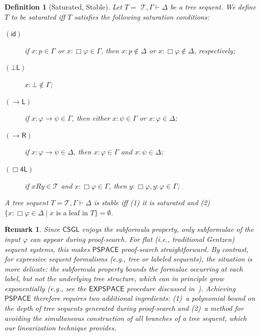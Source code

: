 \documentclass[copyright,creativecommons]{eptcs}
\newtheorem{definition}[theorem]{Definition}
\newtheorem{remark}[theorem]{Remark}
\newcommand{\tel}{\mathcal{T}}
\newcommand{\iffi}{\textit{iff} }
\renewcommand{\phi}{\varphi}
\newcommand{\calc}{\mathsf{CSGL}}
\newcommand{\lab}{\mathsf{Lab}}
\newcommand{\lang}{\mathscr{L}}
\newcommand{\id}{\mathsf{id}}
\newcommand{\sar}{\vdash}
\newcommand{\tseq}{T} %
\newcommand{\impleft}{{\rightarrow}\mathsf{L}}
\newcommand{\impright}{{\rightarrow}\mathsf{R}}
\newcommand{\treesequent}{ $\tel, \Gamma \sar \Delta$ }
\newcommand{\botrule}{\bot\mathsf{L}}
\newcommand{\set}[1]{\{#1\}}
\newcommand{\pspace}{\mathsf{PSPACE}}
\newcommand{\expspace}{\mathsf{EXPSPACE}}
\newcommand{\boxlc}{(\Box\mathsf{4L})}
\begin{document}
\begin{definition}[Saturated, Stable]\label{def:saturatedsequent}
Let $T =  $\treesequent be a tree sequent. We define $T$ to be \emph{saturated} \iffi $T$ satisfies the following \emph{saturation conditions}:
\begin{description}

\item[$(\id)$] if $x : p \in \Gamma$ or $x : \Box \phi \in \Gamma$, then $x : p \notin \Delta$ or $x : \Box \phi \notin \Delta$, respectively;

\item [$(\botrule)$] $x:\bot \notin \Gamma$;

\item [$(\impleft)$] if $x: \phi\rightarrow\psi \in \Gamma$, then either $x:\psi \in \Gamma$ or $x:\phi\in\Delta$;

\item [$(\impright)$] if $x: \phi\rightarrow\psi \in \Delta$, then $x:\phi \in \Gamma$ and $x:\psi\in\Delta$;

\item [$\boxlc$] if $xRy \in \tel$ and $x:\Box\phi\in\Gamma$, then $y: \Box\phi, y: \phi\in\Gamma$;

\end{description}
A tree sequent $\tseq = \tel, \Gamma \sar \Delta$ is \emph{stable} \iffi (1) it is saturated and (2) $\set{x : \Box \phi \in \Delta \mid x \text{ is a leaf in } \tseq} = \emptyset$. %
\end{definition}

\begin{remark}\label{rem:pspace-intuition} Since $\calc$ enjoys the subformula property, only subformulae of the input $\phi$ can appear during proof-search. For flat (i.e., traditional Gentzen) sequent systems, this makes $\pspace$ proof-search straightforward. By contrast, for expressive sequent formalisms (e.g., tree or labeled sequents), the situation is more delicate: the subformula property bounds 
the formulae occurring at each label, but not the underlying tree structure, which can in principle grow exponentially (e.g., see the $\expspace$ procedure discussed in~\cite{MagPer23}). Achieving $\pspace$ therefore requires two additional ingredients: (1)~a polynomial bound on the depth of tree sequents generated during proof-search and (2)~a method for avoiding the simultaneous construction of all branches of a tree sequent, which our linearization technique provides.
\end{remark}
\end{document}

